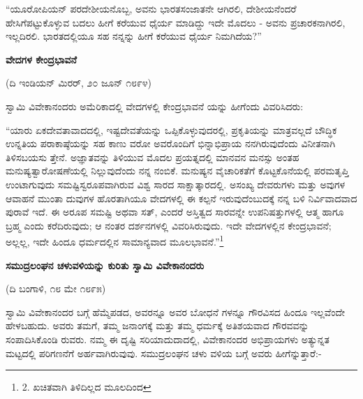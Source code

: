“ಯೂರೋಪಿಯನ್ ಪರದೇಶೀಯನೊಬ್ಬ, ಅವನು ಭಾರತಸಂಜಾತನೇ ಆಗಿರಲಿ, ದೇಶೀಯನೆಂದರೆ ಹೇಸಿಗೆಪಟ್ಟುಕೊಳ್ಳುವ ಬದಲು ಹೀಗೆ ಕರೆಯುವ ಧೈರ್ಯ ಮಾಡಿದ್ದು ಇದೇ ಮೊದಲು - ಅವನು ಪ್ರಚಾರಕನಾಗಿರಲಿ, ಇಲ್ಲದಿರಲಿ. ಭಾರತದಲ್ಲಿಯೂ ಸಹ ನನ್ನನ್ನು ಹೀಗೆ ಕರೆಯುವ ಧೈರ್ಯ ನಿಮಗಿದೆಯ?”

\begin{center}
\textbf{ವೇದಗಳ ಕೇಂದ್ರಭಾವನೆ}
\end{center}

\begin{center}
(ದಿ ಇಂಡಿಯನ್ ಮಿರರ್, ೨೦ ಜೂನ್ ೧೮೯೪)
\end{center}

ಸ್ವಾಮಿ ವಿವೇಕಾನಂದರು ಅಮೆರಿಕಾದಲ್ಲಿ ವೇದಗಳಲ್ಲಿ ಕೇಂದ್ರಭಾವನೆ ಯನ್ನು ಹೀಗೆಂದು ವಿವರಿಸಿದರು:

“ಯಾರು ಏಕದೇವತಾವಾದದಲ್ಲಿ, ಇಷ್ಟದೇವತೆಯನ್ನು ಒಪ್ಪಿಕೊಳ್ಳುವುದರಲ್ಲಿ, ಪ್ರಕೃತಿಯನ್ನು ಮಾತ್ರವಲ್ಲದೆ ಬೌದ್ಧಿಕ ಉನ್ನತಿಯ ಪರಾಕಾಷ್ಠೆಯನ್ನು ಸಹ ಕಾಣು ವರೋ ಅವರೊಂದಿಗೆ ಭಿನ್ನಾಭಿಪ್ರಾಯ ನನಗಿರುವುದೆಂದು ವಿನೀತನಾಗಿ ತಿಳಿಸಬಯಸು ತ್ತೇನೆ. ಅಜ್ಞಾತವನ್ನು ತಿಳಿಯುವ ಮೊದಲ ಪ್ರಯತ್ನದಲ್ಲಿ ಮಾನವನ ಮನಸ್ಸು ಅಂತಹ ಮನುಷ್ಯತ್ವಾರೋಷಣೆಯಲ್ಲಿ ನಿಲ್ಲುವುದೆಂದು ನನ್ನ ನಂಬಿಕೆ. ಮನುಷ್ಯನ ವೈಚಾರಿಕತೆಗೆ ಕೊಟ್ಟಕೊನೆಯಲ್ಲಿ ಪರಮತೃಪ್ತಿ ಉಂಟಾಗುವುದು ಸಮಷ್ಟಿಸ್ವರೂಪವಾಗಿರುವ ವಿಶ್ವ ಸಾರದ ಸಾಕ್ಷಾತ್ಕಾರದಲ್ಲಿ. ಅಸಂಖ್ಯ ದೇವರುಗಳು ಮತ್ತು ಅವುಗಳ ಆವಾಹನೆ ಮುಂತಾ ದುವುಗಳ ಹೊರತಾಗಿಯೂ ವೇದಗಳಲ್ಲಿ ಈ ಕಲ್ಪನೆ ಇರುವುದೆಂಬುದಕ್ಕೆ ನನ್ನ ಬಳಿ ನಿರ್ವಿವಾದವಾದ ಪುರಾವೆ ಇದೆ. ಈ ಅರೂಪ ಸಮಷ್ಟಿ ಅಥವಾ ಸತ್, ಎಂದರೆ ಅಸ್ತಿತ್ವದ ಸಾರವನ್ನೇ ಉಪನಿಷತ್ತುಗಳಲ್ಲಿ ಆತ್ಮ ಹಾಗೂ ಬ್ರಹ್ಮ ಎಂದು ಕರೆದಿರುವುದು; ಆ ನಂತರ ದರ್ಶನಗಳಲ್ಲಿ ವಿವರಿಸಿರುವುದು. ಇದೇ ವೇದಗಳಲ್ಲಿನ ಕೇಂದ್ರಭಾವನೆ; ಅಲ್ಲಲ್ಲ, ಇದೇ ಹಿಂದೂ ಧರ್ಮದಲ್ಲಿನ ಸಾಮಾನ್ಯವಾದ ಮೂಲಭಾವನೆ.”\footnote{2. ಖಚಿತವಾಗಿ ತಿಳಿದಿಲ್ಲದ ಮೂಲದಿಂದ}

\begin{center}
\textbf{ಸಮುದ್ರಲಂಘನ ಚಳುವಳಿಯನ್ನು ಕುರಿತು ಸ್ವಾಮಿ ವಿವೇಕಾನಂದರು}
\end{center}

\begin{center}
(ದಿ ಬಂಗಾಳಿ, ೧೮ ಮೇ ೧೮೯೫)
\end{center}

ಸ್ವಾಮಿ ವಿವೇಕಾನಂದರ ಬಗ್ಗೆ ಹೆಮ್ಮೆಪಡದ, ಅವರನ್ನೂ ಅವರ ಬೋಧನೆ ಗಳನ್ನೂ ಗೌರವಿಸದ ಹಿಂದೂ ಇಲ್ಲವೆಂದೇ ಹೇಳಬಹುದು. ಅವರು ತಮಗೆ, ತಮ್ಮ ಜನಾಂಗಕ್ಕೆ ಮತ್ತು ತಮ್ಮ ಧರ್ಮಕ್ಕೆ ಅತಿಶಯವಾದ ಗೌರವವನ್ನು ಸಂಪಾದಿಸಿಕೊಂಡಿ ರುವರು. ನಮ್ಮ ಈ ದೃಷ್ಟಿ ಸರಿಯಾದುದಾದಲ್ಲಿ, ವಿವೇಕಾನಂದರ ಅಭಿಪ್ರಾಯಗಳು ಅತ್ಯುನ್ನತ ಮಟ್ಟದಲ್ಲಿ ಪರಿಗಣನೆಗೆ ಅರ್ಹವಾಗಿರುವುವು. ಸಮುದ್ರಲಂಘನ ಚಳು ವಳಿಯ ಬಗ್ಗೆ ಅವರು ಹೀಗೆನ್ನುತ್ತಾರೆ:-

